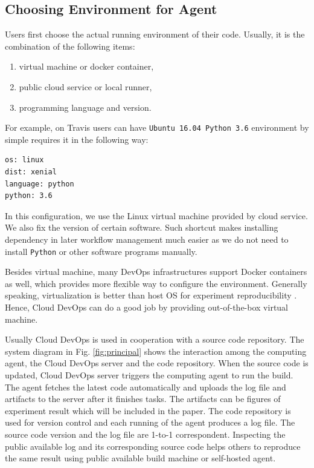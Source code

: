 \documentclass[10pt, conference, compsocconf]{IEEEtran}
\begin{document}
\subsection{Choosing Environment for Agent}
Users first choose the actual running environment of their code. Usually, it is the combination of the following items:
\begin{enumerate}
\item virtual machine or docker container,
\item public cloud service or local runner,
\item programming language and version.
\end{enumerate}

For example, on Travis users can have  \texttt{Ubuntu 16.04 Python 3.6} environment by simple requires it in the following way:
\begin{lstlisting}[caption={environment configuration}]
os: linux
dist: xenial
language: python
python: 3.6
\end{lstlisting}

In this configuration, we use the Linux virtual machine provided by cloud service. We also fix the version of certain software. 
Such shortcut makes installing dependency in later workflow management much easier as we do not need to install \texttt{Python} or other software programs manually.

Besides virtual machine, many DevOps infrastructures support Docker containers as well, which provides more flexible way to configure the environment. Generally speaking, virtualization is better than host OS for experiment reproducibility \cite{Howe12}. Hence, Cloud DevOps can do a good job by providing out-of-the-box virtual machine.

Usually Cloud DevOps is used in cooperation with a source code repository. The system diagram in Fig. \ref{fig:principal} shows the interaction among the computing agent, the Cloud DevOps server and the code repository. When the source code is updated, Cloud DevOps server triggers the computing agent to run the build. The agent fetches the latest code automatically and uploads the log file and artifacts to the server after it finishes tasks. The artifacts can be figures of experiment result which will be included in the paper.
The code repository is used for version control and each running of the agent produces a log file. The source code version and the log file are 1-to-1 correspondent. Inspecting the public available log and its corresponding source code helps others to reproduce the same result using public available build machine or
self-hosted agent.
\end{document}
